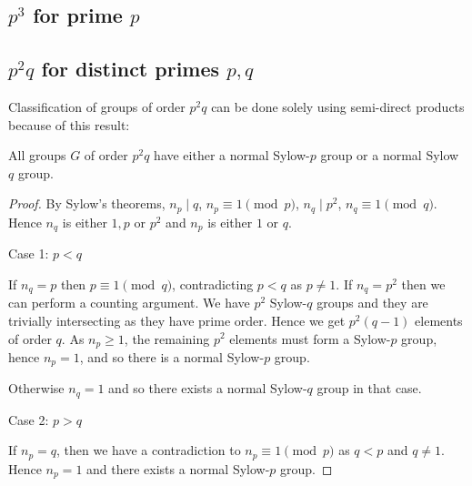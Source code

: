 \documentclass[a4paper,11pt, titlepage]{article}
\theoremstyle{remark}
\begin{document}
\subsection{$p^3$ for prime $p$}
\label{$p^3$ for prime $p$}

\subsection{$p^2 q$ for distinct primes $p, q$}
\label{$p^2 q$ for distinct primes $p, q$}

Classification of groups of order $p^2 q$ can be done solely using semi-direct products because of this result:
\begin{lemma}\label{Groups of order $p^2 q$ have normal Sylow subgroup}
    All groups $G$ of order $p^2 q$ have either a normal Sylow-$p$ group or a normal Sylow $q$ group.
\end{lemma}
\begin{proof}
    By Sylow's theorems, $n_p \mid q$, $n_p \equiv 1 \pmod p$, $n_q \mid p^2$, $n_q \equiv 1 \pmod q$. Hence $n_q$ is either $1, p$ or $p^2$ and $n_p$ is either $1$ or $q$.
    
    Case 1: $p < q$
    
    If $n_q = p$ then $p \equiv 1 \pmod q$, contradicting $p < q$ as $p \neq 1$.
    If $n_q = p^2$ then we can perform a counting argument. We have $p^2$ Sylow-$q$ groups and they are trivially intersecting as they have prime order. Hence we get $p^2 (q - 1)$ elements of order $q$. As $n_p \geq 1$, the remaining $p^2$ elements must form a Sylow-$p$ group, hence $n_p = 1$, and so there is a normal Sylow-$p$ group.

    Otherwise $n_q = 1$ and so there exists a normal Sylow-$q$ group in that case.

    Case 2: $p > q$
    
    If $n_p = q$, then we have a contradiction to $n_p \equiv 1 \pmod p$ as $q < p$ and $q \neq 1$. Hence $n_p = 1$ and there exists a normal Sylow-$p$ group. 
\end{proof}
\end{document}
